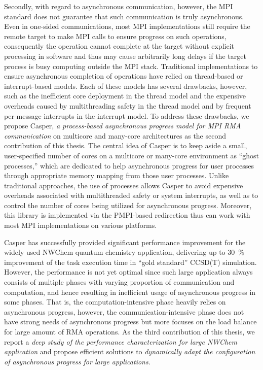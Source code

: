 Secondly, with regard to asynchronous communication, however, the MPI standard does
not guarantee that such communication is truly asynchronous. Even in one-sided
communications, most MPI implementations still require the remote target to make
MPI calls to ensure progress on such operations, consequently the operation
cannot complete at the target without explicit processing in software and
thus may cause arbitrarily long delays if the target process is busy computing
outside the MPI stack.
Traditional implementations to ensure asynchronous completion of operations
have relied on thread-based or interrupt-based models. Each of these models
has several drawbacks, however, such as the inefficient core deployment in
the thread model and the expensive overheads caused by multithreading safety
in the thread model and by frequent per-message interrupts in the interrupt model.
To address these drawbacks, we propose Casper, \emph{a process-based
asynchronous progress model for MPI RMA communication} on multicore and
many-core architectures as the second contribution of this thesis. The central
idea of Casper is to keep aside a small, user-specified number of cores on a
multicore or many-core environment as ``ghost processes,'' which are dedicated
to help asynchronous progress for user processes through appropriate memory
mapping from those user processes. Unlike traditional approaches, the use of
processes allows Casper to avoid expensive overheads associated with
multithreaded safety or system interrupts, as well as to control the number of
cores being utilized for asynchronous progress. Moreover, this library is
implemented via the PMPI-based redirection thus can work with most MPI
implementations on various platforms.

Casper has successfully provided significant performance improvement
for the widely used NWChem quantum chemistry application, delivering up to
30~\% improvement of the task execution time in ``gold standard'' CCSD(T)
simulation. However, the performance is not yet optimal since such large
application always consists of multiple phases with varying proportion of
communication and computation, and hence resulting in inefficient usage of
asynchronous progress in some phases. That is, the computation-intensive
phase heavily relies on asynchronous progress, however, the
communication-intensive phase does not have strong needs of asynchronous
progress but more focuses on the load balance for large amount of RMA
operations. As the third contribution of this thesis, we report a
\emph{deep study of the performance characterization for large NWChem
application} and propose efficient solutions to \emph{dynamically adapt
the configuration of asynchronous progress for large applications}.

